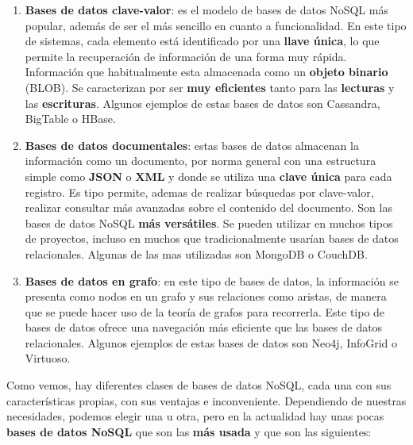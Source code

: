 \begin{enumerate}[label=(\alph*)]
    \item \textbf{Bases de datos clave-valor}: es el modelo de bases de datos NoSQL más popular, además de ser el más sencillo en cuanto a funcionalidad. En este tipo de sistemas, cada elemento está identificado por una \textbf{llave única}, lo que permite la recuperación de información de una forma muy rápida. Información que habitualmente esta almacenada como un \textbf{objeto binario} (BLOB). Se caracterizan por ser \textbf{muy eficientes} tanto para las \textbf{lecturas} y las \textbf{escrituras}. Algunos ejemplos de estas bases de datos son Cassandra, BigTable o HBase.

    \item \textbf{Bases de datos documentales}: estas bases de datos almacenan la información como un documento, por norma general con una estructura simple como \textbf{JSON} o \textbf{XML} y donde se utiliza una \textbf{clave única} para cada registro. Es tipo permite, ademas de realizar búsquedas por clave-valor, realizar consultar más avanzadas sobre el contenido del documento. Son las bases de datos NoSQL \textbf{más versátiles}. Se pueden utilizar en muchos tipos de proyectos, incluso en muchos que tradicionalmente usarían bases de datos relacionales. Algunas de las mas utilizadas son MongoDB o CouchDB.

    \item \textbf{Bases de datos en grafo}: en este tipo de bases de datos, la información se presenta como nodos en un grafo y sus relaciones como aristas, de manera que se puede hacer uso de la teoría de grafos para recorrerla. Este tipo de bases de datos ofrece una navegación más eficiente que las bases de datos relacionales. Algunos ejemplos de estas bases de datos son Neo4j, InfoGrid o Virtuoso.
\end{enumerate}

Como vemos, hay diferentes clases de bases de datos NoSQL, cada una con sus características propias, con sus ventajas e inconveniente. Dependiendo de nuestras necesidades, podemos elegir una u otra, pero en la actualidad hay unas pocas \textbf{bases de datos NoSQL} que son las \textbf{más usada} y que son las siguientes:

